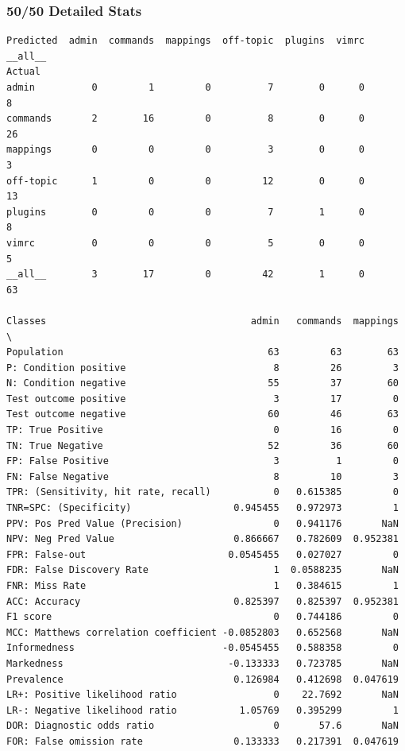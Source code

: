 \documentclass[12pt, a4paper]{article}
\begin{document}
\subsubsection{50/50 Detailed Stats}
\label{5050stats}
\begin{verbatim}
Predicted  admin  commands  mappings  off-topic  plugins  vimrc  __all__
Actual                                                                  
admin          0         1         0          7        0      0        8
commands       2        16         0          8        0      0       26
mappings       0         0         0          3        0      0        3
off-topic      1         0         0         12        0      0       13
plugins        0         0         0          7        1      0        8
vimrc          0         0         0          5        0      0        5
__all__        3        17         0         42        1      0       63

Classes                                    admin   commands  mappings  \
Population                                    63         63        63   
P: Condition positive                          8         26         3   
N: Condition negative                         55         37        60   
Test outcome positive                          3         17         0   
Test outcome negative                         60         46        63   
TP: True Positive                              0         16         0   
TN: True Negative                             52         36        60   
FP: False Positive                             3          1         0   
FN: False Negative                             8         10         3   
TPR: (Sensitivity, hit rate, recall)           0   0.615385         0   
TNR=SPC: (Specificity)                  0.945455   0.972973         1   
PPV: Pos Pred Value (Precision)                0   0.941176       NaN   
NPV: Neg Pred Value                     0.866667   0.782609  0.952381   
FPR: False-out                         0.0545455   0.027027         0   
FDR: False Discovery Rate                      1  0.0588235       NaN   
FNR: Miss Rate                                 1   0.384615         1   
ACC: Accuracy                           0.825397   0.825397  0.952381   
F1 score                                       0   0.744186         0   
MCC: Matthews correlation coefficient -0.0852803   0.652568       NaN   
Informedness                          -0.0545455   0.588358         0   
Markedness                             -0.133333   0.723785       NaN   
Prevalence                              0.126984   0.412698  0.047619   
LR+: Positive likelihood ratio                 0    22.7692       NaN   
LR-: Negative likelihood ratio           1.05769   0.395299         1   
DOR: Diagnostic odds ratio                     0       57.6       NaN   
FOR: False omission rate                0.133333   0.217391  0.047619   


\end{verbatim}
\end{document}
